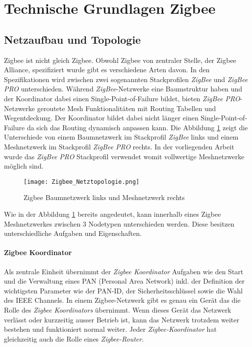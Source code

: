 \clearpage
\section{Technische Grundlagen Zigbee}\label{sec:TechnischeGrundlagenZigbee}

\subsection{Netzaufbau und Topologie}\label{subsec:NetzaufbauundTopologie}
Zigbee ist nicht gleich Zigbee. Obwohl Zigbee von zentraler Stelle, der Zigbee Alliance, spezifiziert wurde gibt es verschiedene Arten davon. In den Spezifikationen wird zwischen zwei sogenannten Stackprofilen \textit{ZigBee} und \textit{ZigBee PRO} unterschieden.
Während \textit{ZigBee}-Netzwerke eine Baumstruktur haben und der Koordinator dabei einen Single-Point-of-Failure bildet, bieten \textit{ZigBee PRO}-Netzwerke geroutete Mesh Funktionalitäten mit Routing Tabellen und Wegentdeckung. Der Koordinator bildet dabei nicht länger einen Single-Point-of-Failure da sich das Routing dynamisch anpassen kann.
Die Abbildung \ref{fig:NetzwerktopologienZigbee} zeigt die Unterschiede von einem Baumnetzwerk im Stackprofil \textit{ZigBee} links und einem Meshnetzwerk im Stackprofil \textit{ZigBee PRO} rechts.
In der vorliegenden Arbeit wurde das \textit{ZigBee PRO} Stackprofil verwendet womit vollwertige Meshnetzwerke möglich sind.

\begin{figure}[h]
	\centering
	\texttt{[image: Zigbee\_Netztopologie.png]}
	\caption{Zigbee Baumnetzwerk links und Meshnetzwerk rechts \cite[S.~221]{markus_krause_rainer_konrad_zigbee_2014}}	\label{fig:NetzwerktopologienZigbee}
\end{figure}

Wie in der Abbildung \ref{fig:NetzwerktopologienZigbee} bereits angedeutet, kann innerhalb eines Zigbee Meshnetzwerkes zwischen 3 Nodetypen unterschieden werden. Diese besitzen unterschiedliche Aufgaben und Eigenschaften.

\paragraph{Zigbee Koordinator}\label{par:ZigbeeKoordinator}
Als zentrale Einheit übernimmt der \textit{Zigbee Koordinator} Aufgaben wie den Start und die Verwaltung eines PAN (Personal Area Network) inkl. der Definition der wichtigsten Parameter wie der PAN-ID, der Sicherheitsschlüssel sowie die Wahl des IEEE Channels.
In einem Zigbee-Netzwerk gibt es genau ein Gerät das die Rolle des \textit{Zigbee Koordinators} übernimmt. Wenn dieses Gerät das Netzwerk verlässt oder kurzzeitig ausser Betrieb ist, kann das Netzwerk trotzdem weiter bestehen und funktioniert normal weiter.
Jeder \textit{Zigbee-Koordinator} hat gleichzeitig auch die Rolle eines \textit{Zigbee-Router}.

